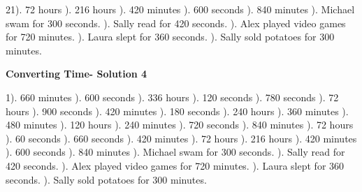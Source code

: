 \documentclass{article}%
\begin{document}
21). 72 hours%
). 216 hours%
). 420 minutes%
). 600 seconds%
). 840 minutes%
). Michael swam for 300 seconds.%
). Sally read for 420 seconds.%
). Alex played video games for 720 minutes.%
). Laura slept for 360 seconds.%
). Sally sold potatoes for 300 minutes.%
\newline%
\newpage%
\large%
\begin{center}%
\textbf{Converting Time- Solution 4}%
\newline%
\end{center} \normalsize%
1). 660 minutes%
). 600 seconds%
). 336 hours%
). 120 seconds%
). 780 seconds%
). 72 hours%
). 900 seconds%
). 420 minutes%
). 180 seconds%
). 240 hours%
). 360 minutes%
). 480 minutes%
). 120 hours%
). 240 minutes%
). 720 seconds%
). 840 minutes%
). 72 hours%
). 60 seconds%
). 660 seconds%
). 420 minutes%
). 72 hours%
). 216 hours%
). 420 minutes%
). 600 seconds%
). 840 minutes%
). Michael swam for 300 seconds.%
). Sally read for 420 seconds.%
). Alex played video games for 720 minutes.%
). Laura slept for 360 seconds.%
). Sally sold potatoes for 300 minutes.%
\newline%
\newpage%
\end{document}
